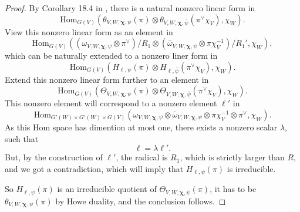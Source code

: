 \documentclass[twoside]{amsart}
\newcommand{\Hom}{{\mathrm{Hom}}} \renewcommand{\Im}{{\mathrm{Im}}}
\theoremstyle{plain}
\numberwithin{equation}{section}
\begin{document}
\begin{proof}
By Corollary 18.4 in \cite{GKT}, there is a natural nonzero linear form in 
\[
\Hom_{G(V)}(\theta_{V,W,\boldsymbol{\chi},\psi}(\pi)\otimes \theta_{V,W,\boldsymbol{\chi},\bar{\psi}}(\pi^\vee \chi_V), \chi_W).
\]
View this nonzero linear form as an element in 
\[
\Hom_{G(V)}((\omega_{V,W,\boldsymbol{\chi},\psi}\otimes \pi^\vee)/R_1 \otimes (\bar{\omega}_{V,W,\boldsymbol{\chi},\psi} \otimes \pi \chi_V^{-1} )/R_1' ,\chi_W),
\]
which can be naturally extended to a nonzero liner form in 
\[
\Hom_{G(V)}( H_{\ell,\psi}(\pi)\otimes H_{\ell,\bar{\psi}}(\pi^\vee \chi_V),\chi_W ).
\]
Extend this nonzero linear form further to an element in
\[
\Hom_{G(V)}( \Theta_{V,W,\boldsymbol{\chi},\psi}(\pi)\otimes \Theta_{V,W,\boldsymbol{\chi},\bar{\psi}}(\pi^\vee \chi_V), \chi_W  ).
\]
This nonzero element will correspond to a nonzero element $\ell'$ in
\[
\Hom_{G'(W)\times G'(W)\times G(V)} (\omega_{V,W,\boldsymbol{\chi},\psi}\otimes \bar{\omega}_{V,W,\boldsymbol{\chi},\psi} \otimes \pi \chi_V^{-1}\otimes \pi^\vee , \chi_W ).
\]
As this Hom space has dimention at most one, there exists a nonzero scalar $\lambda$, such that
\[
\ell=\lambda \ell'.
\]
But, by the construction of $\ell'$, the radical is $R_1$, which is strictly larger than $R$, and we got a contradiction, which will imply that $H_{\ell,\psi}(\pi)$ is irreducible.

So $H_{\ell,\psi}(\pi)$ is an irreducible quotient of $\Theta_{V,W,\boldsymbol{\chi},\psi}(\pi)$, it has to be $\theta_{V,W,\boldsymbol{\chi},\psi}(\pi)$ by Howe duality, and the conclusion follows.
\end{proof}


\end{document}
